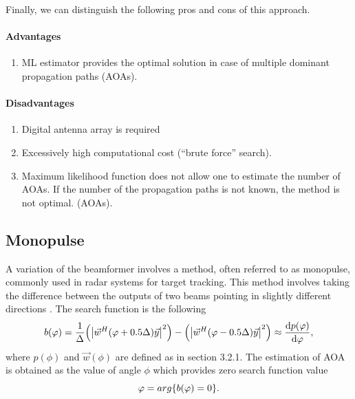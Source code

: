 Finally, we can distinguish the following pros and cons of this approach.
\paragraph{Advantages}%
\label{par:advantages}
\begin{enumerate}
    \item ML estimator provides the optimal solution in case of multiple dominant propagation paths
(AOAs).
\end{enumerate}

\paragraph{Disadvantages}%
\label{par:disadvantages}
\begin{enumerate}
     \item Digital antenna array is required
     \item Excessively high computational cost (“brute force” search).
     \item Maximum likelihood function does not allow one to estimate the number of AOAs. If the
    number of the propagation paths is not known, the method is not optimal.
(AOAs).
\end{enumerate}


\subsection{Monopulse}%
\label{sub:monopulse}

A variation of the beamformer involves a method, often referred to as
monopulse, commonly used in radar systems for target tracking. This method
involves taking the difference between the outputs of two beams pointing in
slightly different directions \cite{Tuncer2009}. The search function is the following
\begin{equation}
    \label{eq:}
    b(\varphi) = \frac{1}{\Delta} \qty(\abs{\vec w^H(\varphi+0.5 \Delta)\vec y}^2)
    -
    \qty(\abs{\vec w^H(\varphi-0.5 \Delta)\vec y}^2) \approx \dv{p(\varphi)}{\varphi} ,
\end{equation}
where $p(\phi)$ and  $\vec w(\phi)$ are defined as in section 3.2.1. 
The estimation of AOA is obtained as the
value of angle $\phi$ which provides zero search function value
\begin{equation}
    \label{eq:}
    \varphi = arg\qty{b(\varphi) = 0}.
\end{equation}

